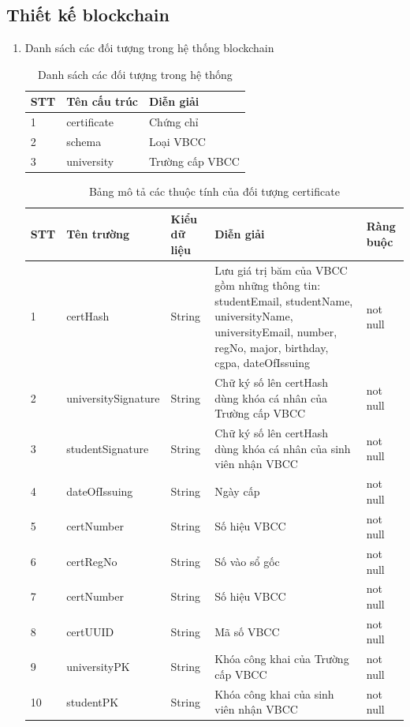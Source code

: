 \subsection{Thiết kế blockchain}
\begin{enumerate}
\item 
Danh sách các đối tượng trong hệ thống blockchain


\begin{table}[H]
\caption{Danh sách các đối tượng trong hệ thống}
	\label{table:asset}
	\begin{tabularx} {\textwidth} {|p{1cm}|p{3cm}|X|}
\hline
		STT &	Tên cấu trúc &  Diễn giải \\ \hline
		1 & certificate	& Chứng chỉ  \\ \hline
		2 & schema  &  Loại VBCC  \\ \hline
		3 & university	&  Trường cấp VBCC  \\ \hline
\end{tabularx}
\end{table}

\begin{table}[H]
\caption{Bảng mô tả các thuộc tính của đối tượng certificate}
	\label{table:assetcertificate}
	\begin{tabularx} {\textwidth} {|p{0.8cm}|p{3.5cm}|p{2.5cm}|X|p{2cm}|}
\hline
		STT &	Tên trường & Kiểu dữ liệu & Diễn giải & Ràng buộc \\ \hline
		1 & certHash	& String & Lưu giá trị băm của VBCC gồm những thông tin: studentEmail, studentName, universityName, universityEmail, number, regNo, major, birthday, cgpa, dateOfIssuing  & not null \\ \hline
		2 & universitySignature & String  & Chữ ký số lên certHash dùng khóa cá nhân của Trường cấp VBCC  & not null \\ \hline
		3 & studentSignature	&  String & Chữ ký số lên certHash dùng khóa cá nhân của sinh viên nhận VBCC  & not null\\ \hline
		4 & dateOfIssuing	& String & Ngày cấp  &not null \\ \hline
		5 & certNumber	& String & Số hiệu VBCC  & not null\\ \hline
		6 & certRegNo	& String & Số vào sổ gốc  & not null\\ \hline
		7 & certNumber	& String & Số hiệu VBCC  & not null\\ \hline
		8 & certUUID	& String & Mã số VBCC  & not null\\ \hline
		9 & universityPK	& String & Khóa công khai của Trường cấp VBCC  &not null \\ \hline
		10 & studentPK	& String & Khóa công khai của sinh viên nhận VBCC  &not null \\ \hline
\end{tabularx}
\end{table}



\end{enumerate}

